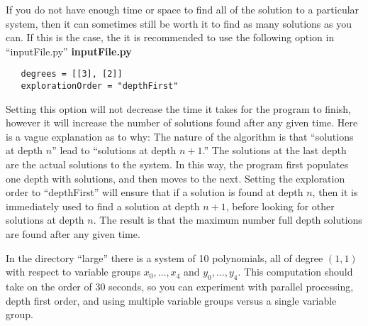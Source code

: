 \documentclass[12pt]{article}
\theoremstyle{definition}
\begin{document}
If you do not have enough time or space to find all of the solution to a 
particular system, then it can sometimes still be worth it to find as 
many solutions as you can. If this is the case, the it is recommended to 
use the following option in ``inputFile.py''
\noindent \textbf{inputFile.py}
\begin{leftbar}
\vspace{-10pt} 
\begin{verbatim}
   degrees = [[3], [2]]
   explorationOrder = "depthFirst"
\end{verbatim}\vspace{-10pt} 
\end{leftbar}
Setting this option will not decrease the time it takes for the program 
to finish, however it will increase the number of solutions 
found after any given time. Here is a vague explanation as to why: The 
nature of the algorithm is that ``solutions at depth $n$'' lead to 
``solutions at depth $n+1$.'' The solutions at the last depth are the 
actual solutions to the system. In this way, the program first populates 
one depth with solutions, and then moves to the next. Setting the 
exploration order to ``depthFirst'' will ensure that if a solution is 
found at depth $n$, then it is immediately used to find a solution at 
depth $n+1$, before looking for other solutions at depth $n$. The result 
is that the maximum number full depth solutions are found after any 
given time.

In the directory ``large'' there is a system of 10 polynomials, all of 
degree $(1,1)$ with respect to variable groups $x_0, \ldots, x_4$ and 
$y_0, \ldots, y_4$. This computation should take on the order of 30 
seconds, so you can experiment with parallel processing, depth first 
order, and using multiple variable groups versus a single variable 
group.




\end{document}
